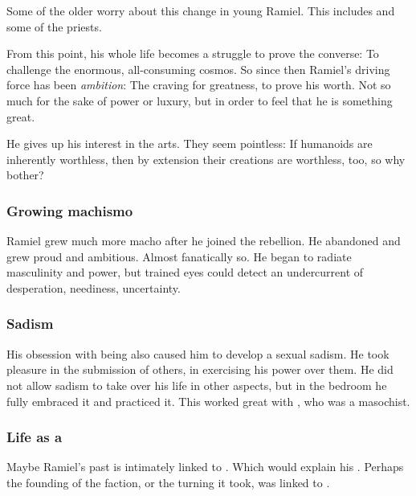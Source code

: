 Some of the older \resphain{} worry about this change in young Ramiel. 
This includes \Sithiyacaan{} and some of the priests. 

From this point, his whole life becomes a struggle to prove the converse: 
To challenge the enormous, all-consuming cosmos. 
So since then Ramiel's driving force has been \emph{ambition}: 
The craving for greatness, to prove his worth. 
Not so much for the sake of power or luxury, but in order to feel that he is something great. 

He gives up his interest in the arts. 
They seem pointless: 
If humanoids are inherently worthless, then by extension their creations are worthless, too, so why bother? 





\subsubsection{Growing machismo}
Ramiel grew much more macho after he joined the rebellion. 
He abandoned  and grew proud and ambitious. 
Almost fanatically so. 
He began to radiate masculinity and power, but trained eyes could detect an undercurrent of desperation, neediness, uncertainty. 





\subsubsection{Sadism}
His obsession with being  also caused him to develop a sexual sadism. 
He took pleasure in the submission of others, in exercising his power over them. 
He did not allow sadism to take over his life in other aspects, but in the bedroom he fully embraced it and practiced it. 
This worked great with \Shiaraid, who was a masochist.






\subsubsection{Life as a \sathariah}
Maybe Ramiel's past is intimately linked to \Cuezca. 
Which would explain his . 
Perhaps the founding of the \Mystraacht{} faction, or the turning it took, was linked to \Cuezca. 

